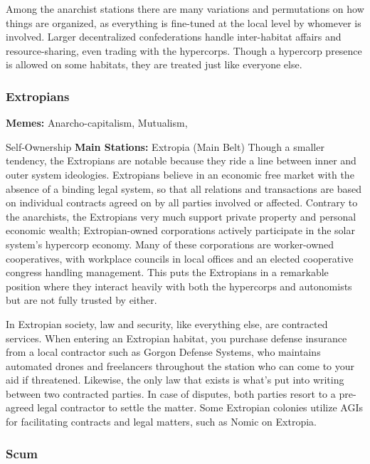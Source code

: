 Among the anarchist stations there are many variations and permutations on how things are organized, 
as everything is fine-tuned at the local level by whomever is involved. Larger decentralized confederations 
handle inter-habitat affairs and resource-sharing, even 
trading with the hypercorps. Though a hypercorp 
presence is allowed on some habitats, they are treated 
just like everyone else.

\subsubsection{Extropians}

\textbf{Memes:} Anarcho-capitalism, Mutualism, 

Self-Ownership
\textbf{Main Stations:} Extropia (Main Belt)
Though a smaller tendency, the Extropians are notable because they ride a line between inner and outer 
system ideologies. Extropians believe in an economic 
free market with the absence of a binding legal system, 
so that all relations and transactions are based on individual contracts agreed on by all parties involved or affected. Contrary to the anarchists, the Extropians very 
much support private property and personal economic 
wealth; Extropian-owned corporations actively participate in the solar system's hypercorp economy. Many 
of these corporations are worker-owned cooperatives, 
with workplace councils in local offices and an elected 
cooperative congress handling management. This puts 
the Extropians in a remarkable position where they 
interact heavily with both the hypercorps and autonomists but are not fully trusted by either.

In Extropian society, law and security, like everything else, are contracted services. When entering an 
Extropian habitat, you purchase defense insurance 
from a local contractor such as Gorgon Defense 
Systems, who maintains automated drones and 
freelancers throughout the station who can come 
to your aid if threatened. Likewise, the only law 
that exists is what's put into writing between two 
contracted parties. In case of disputes, both parties 
resort to a pre-agreed legal contractor to settle the 
matter. Some Extropian colonies utilize AGIs for facilitating contracts and legal matters, such as Nomic 
on Extropia.

\subsubsection{Scum}

